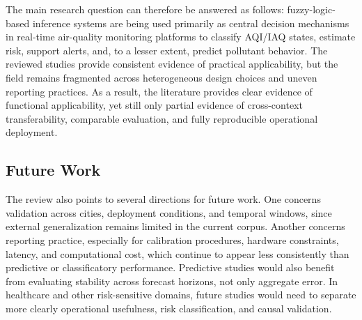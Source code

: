 The main research question can therefore be answered as follows: fuzzy-logic-based inference systems are being used primarily as central decision mechanisms in real-time air-quality monitoring platforms to classify AQI/IAQ states, estimate risk, support alerts, and, to a lesser extent, predict pollutant behavior. The reviewed studies provide consistent evidence of practical applicability, but the field remains fragmented across heterogeneous design choices and uneven reporting practices. As a result, the literature provides clear evidence of functional applicability, yet still only partial evidence of cross-context transferability, comparable evaluation, and fully reproducible operational deployment.

\subsection{Future Work}
The review also points to several directions for future work. One concerns validation across cities, deployment conditions, and temporal windows, since external generalization remains limited in the current corpus. Another concerns reporting practice, especially for calibration procedures, hardware constraints, latency, and computational cost, which continue to appear less consistently than predictive or classificatory performance. Predictive studies would also benefit from evaluating stability across forecast horizons, not only aggregate error. In healthcare and other risk-sensitive domains, future studies would need to separate more clearly operational usefulness, risk classification, and causal validation.\\
